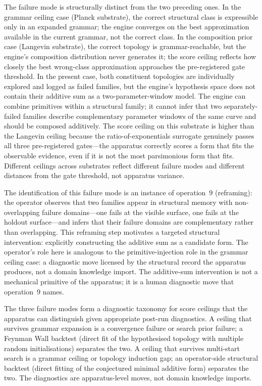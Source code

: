 \documentclass[11pt]{article}
\begin{document}
The failure mode is structurally distinct from the two preceding ones. In the grammar ceiling case (Planck substrate), the correct structural class is expressible only in an expanded grammar; the engine converges on the best approximation available in the current grammar, not the correct class. In the composition prior case (Langevin substrate), the correct topology is grammar-reachable, but the engine's composition distribution never generates it; the score ceiling reflects how closely the best wrong-class approximation approaches the pre-registered gate threshold. In the present case, both constituent topologies are individually explored and logged as failed families, but the engine's hypothesis space does not contain their additive sum as a two-parameter-window model. The engine can combine primitives within a structural family; it cannot infer that two separately-failed families describe complementary parameter windows of the same curve and should be composed additively. The score ceiling on this substrate is higher than the Langevin ceiling because the ratio-of-exponentials surrogate genuinely passes all three pre-registered gates---the apparatus correctly scores a form that fits the observable evidence, even if it is not the most parsimonious form that fits. Different ceilings across substrates reflect different failure modes and different distances from the gate threshold, not apparatus variance.

The identification of this failure mode is an instance of operation~9 (reframing): the operator observes that two families appear in structural memory with non-overlapping failure domains---one fails at the visible surface, one fails at the holdout surface---and infers that their failure domains are complementary rather than overlapping. This reframing step motivates a targeted structural intervention: explicitly constructing the additive sum as a candidate form. The operator's role here is analogous to the primitive-injection role in the grammar ceiling case: a diagnostic move licensed by the structural record the apparatus produces, not a domain knowledge import. The additive-sum intervention is not a mechanical primitive of the apparatus; it is a human diagnostic move that operation~9 names.

The three failure modes form a diagnostic taxonomy for score ceilings that the apparatus can distinguish given appropriate post-run diagnostics. A ceiling that survives grammar expansion is a convergence failure or search prior failure; a Feynman Wall backtest (direct fit of the hypothesised topology with multiple random initialisations) separates the two. A ceiling that survives multi-start search is a grammar ceiling or topology induction gap; an operator-side structural backtest (direct fitting of the conjectured minimal additive form) separates the two. The diagnostics are apparatus-level moves, not domain knowledge imports.
\end{document}
